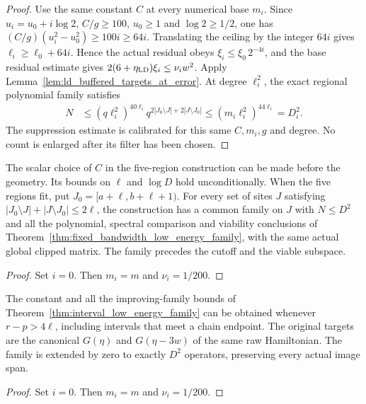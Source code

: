 \begin{proof}\leanok
    Use the same constant $C$ at every numerical base $m_i$.
    Since $u_i=u_0+i\log2$, $C/g\ge100$, $u_0\ge1$ and
    $\log2\ge1/2$, one has
    $(C/g)(u_i^2-u_0^2)\ge100i\ge64i$.
    Translating the ceiling by the integer $64i$ gives
    $\ell_i\ge\ell_0+64i$. Hence the actual residual obeys
    $\xi_i\le\xi_0\,2^{-4i}$, and the base residual estimate gives
    $2(6+\eta_{\rm LD})\xi_i\le\nu_iw^2$.
    Apply Lemma~\ref{lem:ld_buffered_targets_at_error}.
    At degree $\ell_i^2$, the exact regional polynomial family satisfies
    \begin{align}
        N & \le(q\ell_i^2)^{40\ell_i}
        q^{2|J_0\setminus J|+2|J\setminus J_0|}
        \le(m_i\ell_i^2)^{44\ell_i}=D_i^2.
        \label{eq:ld_regional_count_reserve}
    \end{align}
    The suppression estimate is calibrated for this same $C,m_i,g$ and
    degree. No count is enlarged after its filter has been chosen.
\end{proof}

\begin{lemma}
    \label{lem:regional_low_energy_family}
    \leanok
    The scalar choice of $C$ in the five-region construction can be made
    before the geometry. Its bounds on $\ell$ and $\log D$ hold
    unconditionally. When the five regions fit, put
    $J_0=[a+\ell,b+\ell+1)$. For every set of sites $J$ satisfying
    $|J_0\setminus J|+|J\setminus J_0|\le2\ell$, the construction has
    a common family on $J$ with $N\le D^2$ and all the polynomial,
    spectral comparison and viability conclusions of
    Theorem~\ref{thm:fixed_bandwidth_low_energy_family}, with the same
    actual global clipped matrix. The family precedes the cutoff and
    the viable subspace.
\end{lemma}
\begin{proof}\leanok
    Set $i=0$. Then $m_i=m$ and $\nu_i=1/200$.
\end{proof}

\begin{lemma}
    \label{lem:long_interval_low_energy_family}
    \leanok
    The constant and all the improving-family bounds of
    Theorem~\ref{thm:interval_low_energy_family} can be obtained whenever
    $r-p>4\ell$, including intervals that meet a chain endpoint.
    The original targets are the canonical $G(\eta)$ and $G(\eta-3w)$
    of the same raw Hamiltonian. The family is extended by zero to exactly
    $D^2$ operators, preserving every actual image span.
\end{lemma}
\begin{proof}\leanok
    Set $i=0$. Then $m_i=m$ and $\nu_i=1/200$.
\end{proof}


